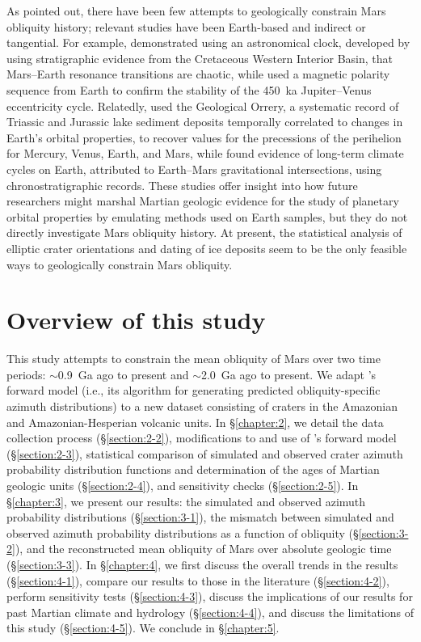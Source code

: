 \documentclass{ucetd}
\begin{document}
As \citet{holo2018a} pointed out, there have been few attempts to geologically constrain Mars obliquity history; relevant studies have been Earth-based and indirect or tangential. For example, \citet{ma2017a} demonstrated using an astronomical clock, developed by \citet{sageman2014a} using stratigraphic evidence from the Cretaceous Western Interior Basin, that Mars--Earth resonance transitions are chaotic, while \citet{kent2018a} used a magnetic polarity sequence from Earth to confirm the stability of the 450~ka Jupiter--Venus eccentricity cycle. Relatedly, \citet{olsen2019a} used the Geological Orrery, a systematic record of Triassic and Jurassic lake sediment deposits temporally correlated to changes in Earth's orbital properties, to recover values for the precessions of the perihelion for Mercury, Venus, Earth, and Mars, while \citet{mau2022a} found evidence of long-term climate cycles on Earth, attributed to Earth--Mars gravitational intersections, using chronostratigraphic records. These studies offer insight into how future researchers might marshal Martian geologic evidence for the study of planetary orbital properties by emulating methods used on Earth samples, but they do not directly investigate Mars obliquity history. At present, the statistical analysis of elliptic crater orientations and dating of ice deposits seem to be the only feasible ways to geologically constrain Mars obliquity.

\section{Overview of this study}
\label{section:1-5}

This study attempts to constrain the mean obliquity of Mars over two time periods: $\sim$0.9~Ga ago to present and $\sim$2.0~Ga ago to present. We adapt \citet{holo2018a}’s forward model (i.e., its algorithm for generating predicted obliquity-specific azimuth distributions) to a new dataset consisting of craters in the Amazonian and Amazonian-Hesperian volcanic units. In §\ref{chapter:2}, we detail the data collection process (§\ref{section:2-2}), modifications to and use of \citet{holo2018a}’s forward model (§\ref{section:2-3}), statistical comparison of simulated and observed crater azimuth probability distribution functions and determination of the ages of Martian geologic units (§\ref{section:2-4}), and sensitivity checks (§\ref{section:2-5}). In §\ref{chapter:3}, we present our results: the simulated and observed azimuth probability distributions (§\ref{section:3-1}), the mismatch between simulated and observed azimuth probability distributions as a function of obliquity (§\ref{section:3-2}), and the reconstructed mean obliquity of Mars over absolute geologic time (§\ref{section:3-3}). In §\ref{chapter:4}, we first discuss the overall trends in the results (§\ref{section:4-1}), compare our results to those in the literature (§\ref{section:4-2}), perform sensitivity tests (§\ref{section:4-3}), discuss the implications of our results for past Martian climate and hydrology (§\ref{section:4-4}), and discuss the limitations of this study (§\ref{section:4-5}). We conclude in §\ref{chapter:5}.
\end{document}
